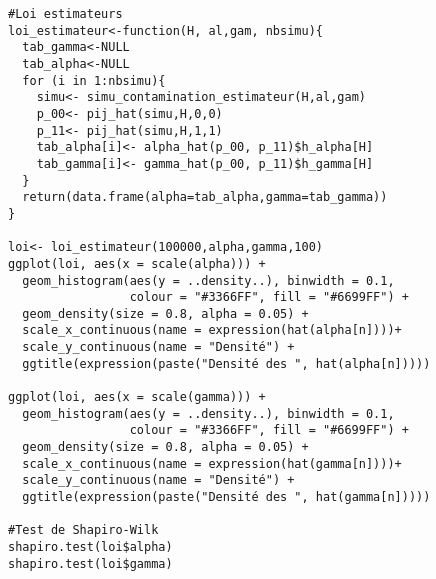 \documentclass[12pt,a4paper]{report}
\theoremstyle{remark}
\begin{document}
\begin{lstlisting}
#Loi estimateurs
loi_estimateur<-function(H, al,gam, nbsimu){
  tab_gamma<-NULL
  tab_alpha<-NULL
  for (i in 1:nbsimu){
    simu<- simu_contamination_estimateur(H,al,gam)
    p_00<- pij_hat(simu,H,0,0)
    p_11<- pij_hat(simu,H,1,1)
    tab_alpha[i]<- alpha_hat(p_00, p_11)$h_alpha[H]
    tab_gamma[i]<- gamma_hat(p_00, p_11)$h_gamma[H]
  }
  return(data.frame(alpha=tab_alpha,gamma=tab_gamma))
}

loi<- loi_estimateur(100000,alpha,gamma,100)
ggplot(loi, aes(x = scale(alpha))) +
  geom_histogram(aes(y = ..density..), binwidth = 0.1,
                 colour = "#3366FF", fill = "#6699FF") +
  geom_density(size = 0.8, alpha = 0.05) +
  scale_x_continuous(name = expression(hat(alpha[n])))+
  scale_y_continuous(name = "Densité") +
  ggtitle(expression(paste("Densité des ", hat(alpha[n]))))

ggplot(loi, aes(x = scale(gamma))) +
  geom_histogram(aes(y = ..density..), binwidth = 0.1,
                 colour = "#3366FF", fill = "#6699FF") +
  geom_density(size = 0.8, alpha = 0.05) +
  scale_x_continuous(name = expression(hat(gamma[n])))+
  scale_y_continuous(name = "Densité") +
  ggtitle(expression(paste("Densité des ", hat(gamma[n]))))

#Test de Shapiro-Wilk
shapiro.test(loi$alpha)
shapiro.test(loi$gamma)
 
\end{lstlisting}
\end{document}
